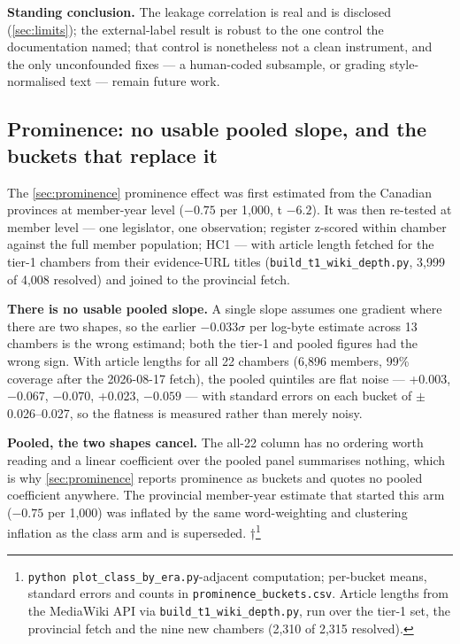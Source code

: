 \textbf{Standing conclusion.} The leakage correlation is real and is disclosed
(\cref{sec:limits}); the external-label result is robust to the one control the
documentation named; that control is nonetheless not a clean instrument, and
the only unconfounded fixes --- a human-coded subsample, or grading
style-normalised text --- remain future work.

\subsection{Prominence: no usable pooled slope, and the buckets that replace it}\label{sec:prominence-full}

The \cref{sec:prominence} prominence effect was first estimated from the Canadian provinces at
member-year level (\(-0.75\) per 1,000, t \(-6.2\)). It was then re-tested at member
level --- one legislator, one observation; register z-scored within chamber
against the full member population; HC1 --- with article length fetched for the
tier-1 chambers from their evidence-URL titles (\texttt{build\_\allowbreak{}t1\_\allowbreak{}wiki\_\allowbreak{}depth.\allowbreak{}py},
3,999 of 4,008 resolved) and joined to the provincial fetch.

\textbf{There is no usable pooled slope.} A single slope assumes one gradient where
there are two shapes, so the earlier \(-0.033\sigma\) per log-byte estimate across 13
chambers is the wrong estimand; both the tier-1 and pooled figures had the
wrong sign. With article lengths for all 22 chambers (6,896 members, 99\%
coverage after the 2026-08-17 fetch), the pooled quintiles are flat noise ---
+0.003, \(-0.067\), \(-0.070\), +0.023, \(-0.059\) --- with standard errors on each bucket
of \(\pm\)0.026--0.027, so the flatness is measured rather than merely noisy.

\textbf{Pooled, the two shapes cancel.} The all-22 column has no ordering worth
reading and a linear coefficient over the pooled panel summarises nothing,
which is why \cref{sec:prominence} reports prominence as buckets and quotes no pooled
coefficient anywhere. The provincial member-year estimate that started this
arm (\(-0.75\) per 1,000) was inflated by the same word-weighting and clustering
inflation as the class arm and is superseded. †\footnote{\texttt{python\ plot\_\allowbreak{}class\_\allowbreak{}by\_\allowbreak{}era.\allowbreak{}py}-adjacent computation; per-bucket means,
  standard errors and counts in \texttt{prominence\_buckets.csv}. Article lengths from
  the MediaWiki API via \texttt{build\_\allowbreak{}t1\_\allowbreak{}wiki\_\allowbreak{}depth.\allowbreak{}py}, run over the tier-1 set, the
  provincial fetch and the nine new chambers (2,310 of 2,315 resolved).}

